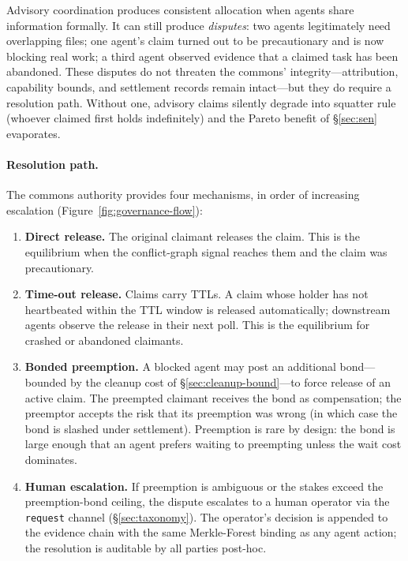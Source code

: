 \documentclass[11pt,a4paper]{article}
\theoremstyle{definition}
\theoremstyle{remark}
\begin{document}
Advisory coordination produces consistent allocation when agents share information formally. It can still produce \emph{disputes}: two agents legitimately need overlapping files; one agent's claim turned out to be precautionary and is now blocking real work; a third agent observed evidence that a claimed task has been abandoned. These disputes do not threaten the commons' integrity---attribution, capability bounds, and settlement records remain intact---but they do require a resolution path. Without one, advisory claims silently degrade into squatter rule (whoever claimed first holds indefinitely) and the Pareto benefit of \S\ref{sec:sen} evaporates.

\paragraph{Resolution path.} The commons authority provides four mechanisms, in order of increasing escalation (Figure~\ref{fig:governance-flow}):
\begin{enumerate}[nosep]
  \item \textbf{Direct release.} The original claimant releases the claim. This is the equilibrium when the conflict-graph signal reaches them and the claim was precautionary.
  \item \textbf{Time-out release.} Claims carry TTLs. A claim whose holder has not heartbeated within the TTL window is released automatically; downstream agents observe the release in their next poll. This is the equilibrium for crashed or abandoned claimants.
  \item \textbf{Bonded preemption.} A blocked agent may post an additional bond---bounded by the cleanup cost of \S\ref{sec:cleanup-bound}---to force release of an active claim. The preempted claimant receives the bond as compensation; the preemptor accepts the risk that its preemption was wrong (in which case the bond is slashed under settlement). Preemption is rare by design: the bond is large enough that an agent prefers waiting to preempting unless the wait cost dominates.
  \item \textbf{Human escalation.} If preemption is ambiguous or the stakes exceed the preemption-bond ceiling, the dispute escalates to a human operator via the \texttt{request} channel (\S\ref{sec:taxonomy}). The operator's decision is appended to the evidence chain with the same Merkle-Forest binding as any agent action; the resolution is auditable by all parties post-hoc.
\end{enumerate}
\end{document}
